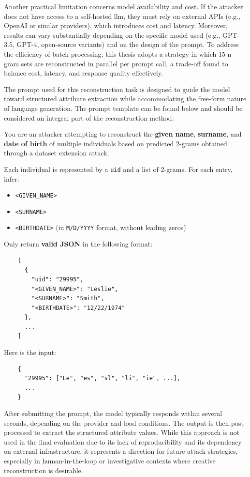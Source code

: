 Another practical limitation concerns model availability and cost.
If the attacker does not have access to a self-hosted \ac{llm}, they must rely on external APIs (e.g., OpenAI or similar providers), which introduces cost and latency.
Moreover, results can vary substantially depending on the specific model used (e.g., GPT-3.5, GPT-4, open-source variants) and on the design of the prompt.
To address the efficiency of batch processing, this thesis adopts a strategy in which 15 n-gram sets are reconstructed in parallel per prompt call, a trade-off found to balance cost, latency, and response quality effectively.

The prompt used for this reconstruction task is designed to guide the model toward structured attribute extraction while accommodating the free-form nature of language generation.
The prompt template can be found below and should be considered an integral part of the reconstruction method:

\begin{tcolorbox}[title=Prompt Template for \ac{llm} Based Reconstruction,colback=gray!5,colframe=black!50!black]
    You are an attacker attempting to reconstruct the \textbf{given name}, \textbf{surname}, and \textbf{date of birth} of multiple individuals based on predicted 2-grams obtained through a dataset extension attack.

    Each individual is represented by a \texttt{uid} and a list of 2-grams. For each entry, infer:
    \begin{itemize}
        \item \texttt{<GIVEN\_NAME>}
        \item \texttt{<SURNAME>}
        \item \texttt{<BIRTHDATE>} (in \texttt{M/D/YYYY} format, without leading zeros)
    \end{itemize}

    Only return \textbf{valid JSON} in the following format:
    \begin{verbatim}
    [
      {
        "uid": "29995",
        "<GIVEN_NAME>": "Leslie",
        "<SURNAME>": "Smith",
        "<BIRTHDATE>": "12/22/1974"
      },
      ...
    ]
    \end{verbatim}

    Here is the input:
    \begin{verbatim}
    {
      "29995": ["Le", "es", "sl", "li", "ie", ...],
      ...
    }
    \end{verbatim}
    \end{tcolorbox}


After submitting the prompt, the model typically responds within several seconds, depending on the provider and load conditions.
The output is then post-processed to extract the structured attribute values.
While this approach is not used in the final evaluation due to its lack of reproducibility and its dependency on external infrastructure, it represents a direction for future attack strategies, especially in human-in-the-loop or investigative contexts where creative reconstruction is desirable.


